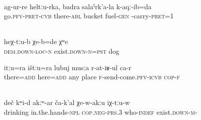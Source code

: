 \begin{exe}

	\ex	{}	\label{ex:I went away from there carrying a bucket of fuel}\\
	\gll	ag-ur-re	heltːu-rka,	badra	salaˁrk'a-la	k-aqː-ib=da  \\
		go.\textsc{pfv}-\textsc{pret}-\textsc{cvb}	there-\textsc{abl}	bucket	fuel-\textsc{gen}	-carry-\textsc{pret}=1\\
	\glt	{}

	\ex	{}	\label{ex:The dog was there}\\
	\gll	heχ-tːu-b	χe-b=de	χʷe\\
		\textsc{dem.down}-\textsc{loc}-\textsc{n}	exist.\textsc{down-n}=\textsc{pst}	dog\\
	\glt	{}

\ex	\label{ex:There, here (her husband) sends her everywhere}
	\gll	itːu=ra		ištːu=ra	lubuj	musːa	r-at-iʁ-ul ca-r  \\
		there=\textsc{add}	here=\textsc{add}	any	place	\textsc{f}-send-come.\textsc{pfv}-\textsc{icvb} \textsc{cop-f}\\
	\glt	{}
	
	\ex	{}	\label{ex:There is nobody here without a drink in the hands}\\
	\gll	deč	kʷi-d	akːʷ-ar	ča-k'al	χe-w-akːu	iχ-tːu-w\\ 
	 	drinking	  in.the.hands-\textsc{npl}   	\textsc{cop.neg}-\textsc{prs.3}	 who-\textsc{indef}	exist.\textsc{down-m}-	 \\
	\glt	{}
\end{exe}

